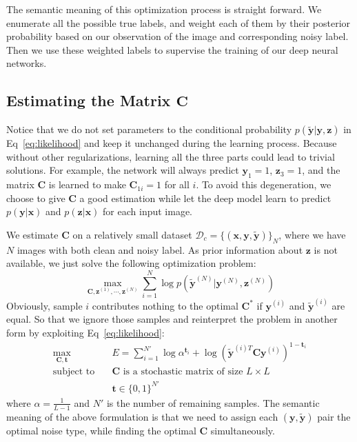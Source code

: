 \documentclass[10pt,twocolumn,letterpaper]{article}
\def\vec{\mathbf}
\def\mat{\mathbf}
\begin{document}
The semantic meaning of this optimization process is straight forward. We enumerate all the possible true labels, and weight each of them by their posterior probability based on our observation of the image and corresponding noisy label. Then we use these weighted labels to supervise the training of our deep neural networks.

\subsection{Estimating the Matrix $\mat{C}$} %
\label{sub:confusion_estimation}
Notice that we do not set parameters to the conditional probability $p(\tilde{\vec{y}}|\vec{y},\vec{z})$ in Eq~\eqref{eq:likelihood} and keep it unchanged during the learning process. Because without other regularizations, learning all the three parts could lead to trivial solutions. For example, the network will always predict $\vec{y}_1 = 1$, $\vec{z}_3 = 1$, and the matrix $\mat{C}$ is learned to make $\mat{C}_{1i} = 1$ for all $i$. To avoid this degeneration, we choose to give $\mat{C}$ a good estimation while let the deep model learn to predict $p(\vec{y} | \vec{x})$ and $p(\vec{z} | \vec{x})$ for each input image.

We estimate $\mat{C}$ on a relatively small dataset $\mathcal{D}_c = \{(\vec{x},\vec{y},\tilde{\vec{y}})\}_N$, where we have $N$ images with both clean and noisy label. As prior information about $\vec{z}$ is not available, we just solve the following optimization problem:
\begin{equation}
    \max_{\mat{C},\vec{z}^{(1)},\cdots,\vec{z}^{(N)}} \sum_{i=1}^N \log p(\tilde{\vec{y}}^{(N)}|\vec{y}^{(N)},\vec{z}^{(N)})
\end{equation}
Obviously, sample $i$ contributes nothing to the optimal $\mat{C}^*$ if $\vec{y}^{(i)}$ and $\tilde{\vec{y}}^{(i)}$ are equal. So that we ignore those samples and reinterpret the problem in another form by exploiting Eq~\ref{eq:likelihood}:
\begin{equation}
\begin{aligned}
\max_{\mat{C},\vec{t}} \quad & E=\sum_{i=1}^{N'} \log \alpha^{\vec{t}_i} + \log (\tilde{\vec{y}}^{(i)T} \mat{C} \vec{y}^{(i)})^{1-\vec{t}_i}\\
\text{subject to} \quad & \mat{C} \text{ is a stochastic matrix of size } L\times L \\
                    & \vec{t} \in \{0,1\}^{N'}
\end{aligned}
\end{equation}
where $\alpha=\frac{1}{L-1}$ and $N'$ is the number of remaining samples. The semantic meaning of the above formulation is that we need to assign each $(\vec{y},\tilde{\vec{y}})$ pair the optimal noise type, while finding the optimal $\mat{C}$ simultaneously.
\end{document}

